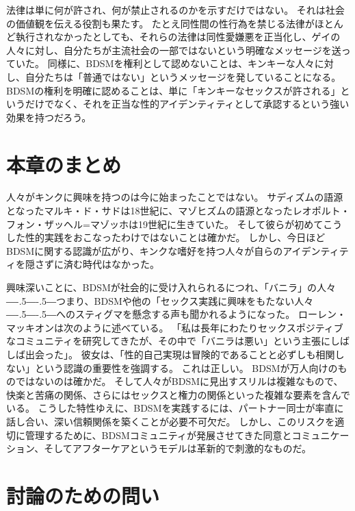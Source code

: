\documentclass[paper=a4,book,openany]{jlreq}
\newcommand{\ig}[1]{}           %
\def\DDASH{―\kern-.5\zw―\kern-.5\zw―} %
\begin{document}
法律は単に何が許され、何が禁止されるのかを示すだけではない。
それは社会の価値観を伝える役割も果たす。
たとえ同性間の性行為を禁じる法律がほとんど執行されなかったとしても、それらの法律は同性愛嫌悪を正当化し、ゲイの人々に対し、自分たちが主流社会の一部ではないという明確なメッセージを送っていた。
同様に、BDSMを権利として認めないことは、キンキーな人々に対し、自分たちは「普通ではない」というメッセージを発していることになる。
BDSMの権利を明確に認めることは、単に「キンキーなセックスが許される」というだけでなく、それを正当な性的アイデンティティとして承認するという強い効果を持つだろう。

\section{本章のまとめ}

人々がキンクに興味を持つのは今に始まったことではない。
サディズムの語源となったマルキ・ド・サドは18世紀に、マゾヒズムの語源となったレオポルト・フォン・ザッヘル=マゾッホは19世紀に生きていた。
そして彼らが初めてこうした性的実践をおこなったわけではないことは確かだ。
しかし、今日ほどBDSMに関する認識が広がり、キンクな嗜好を持つ人々が自らのアイデンティティを隠さずに済む時代はなかった。

興味深いことに、BDSMが社会的に受け入れられるにつれ、「バニラ」の人々{\DDASH}つまり、BDSMや他の「セックス実践に興味をもたない人々{\DDASH}へのスティグマを懸念する声も聞かれるようになった。
ローレン・マッキオン\ig{(Lauren McKeon)}は次のように述べている。
「私は長年にわたりセックスポジティブなコミュニティを研究してきたが、その中で「バニラは悪い」という主張にしばしば出会った」。
彼女は、「性的自己実現は冒険的であることと必ずしも相関しない」という認識の重要性を強調する\citep{mckeon17:_when_it_comes}。
これは正しい。
BDSMが万人向けのものではないのは確かだ。
そして人々がBDSMに見出すスリルは複雑なもので、快楽と苦痛の関係、さらにはセックスと権力の関係といった複雑な要素を含んでいる。
こうした特性ゆえに、BDSMを実践するには、パートナー同士が率直に話し合い、深い信頼関係を築くことが必要不可欠だ。
しかし、このリスクを適切に管理するために、BDSMコミュニティが発展させてきた同意とコミュニケーション、そしてアフターケアというモデルは革新的で刺激的なものだ。

\section{討論のための問い}
\end{document}
